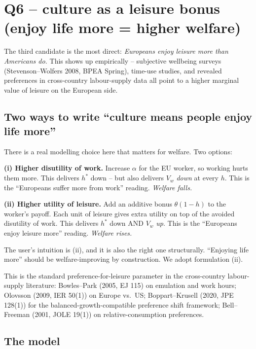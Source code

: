 \documentclass[11pt,a4paper]{article}
\begin{document}
\section{Q6 -- culture as a leisure bonus (enjoy life more = higher welfare)}

The third candidate is the most direct: \emph{Europeans enjoy leisure
more than Americans do.} This shows up empirically -- subjective
wellbeing surveys (Stevenson--Wolfers 2008, BPEA Spring), time-use
studies, and revealed preferences in cross-country labour-supply data
all point to a higher marginal value of leisure on the European side.

\subsection{Two ways to write ``culture means people enjoy life more''}

There is a real modelling choice here that matters for welfare. Two
options:

\textbf{(i) Higher disutility of work.} Increase $\alpha$ for the EU
worker, so working hurts them more. This delivers $h^\ast$ down -- but
also delivers $V_w$ \emph{down} at every $h$. This is the ``Europeans
suffer more from work'' reading. \emph{Welfare falls.}

\textbf{(ii) Higher utility of leisure.} Add an additive bonus
$\theta(1-h)$ to the worker's payoff. Each unit of leisure gives extra
utility on top of the avoided disutility of work. This delivers
$h^\ast$ down AND $V_w$ \emph{up}. This is the ``Europeans enjoy
leisure more'' reading. \emph{Welfare rises.}

The user's intuition is (ii), and it is also the right one
structurally. ``Enjoying life more'' should be welfare-improving by
construction. We adopt formulation (ii).

This is the standard preference-for-leisure parameter in the
cross-country labour-supply literature: Bowles--Park (2005, EJ 115)
on emulation and work hours; Olovsson (2009, IER 50(1)) on
Europe vs.\ US; Boppart--Krusell (2020, JPE 128(1)) for the
balanced-growth-compatible preference shift framework; Bell--Freeman
(2001, JOLE 19(1)) on relative-consumption preferences.

\subsection{The model}
\end{document}
